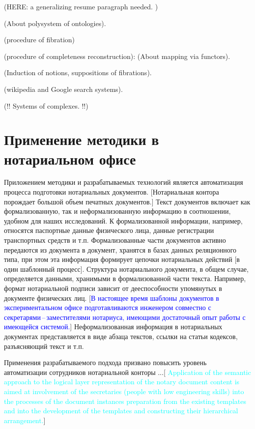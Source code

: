 \documentclass[utf8]{../IncArticle}
\newcommand{\e}[2][fcolor]{\textcolor{pcolor}{[}\textcolor{#1}{#2}\textcolor{pcolor}{]}}
\begin{document}
(HERE: a generalizing resume paragraph needed.  )

(About polysystem of ontologies).

(procedure of fibration)

(procedure of completeness reconstruction): (About mapping via functors).

(Induction of notions, suppositions of fibrations).

(wikipedia and Google search systems).

(!! Systems of complexes. !!)

\section{Применение методики в нотариальном офисе}

Приложением методики и разрабатываемых технологий является
автоматизация процесса подготовки нотариальных документов.
\e{Нотариальная контора порождает большой объем печатных документов.}
Текст документов включает как формализованную, так и неформализованную
информацию в соотношении, удобном для наших исследований.  К
формализованной информации, например, относятся паспортные данные
физического лица, данные регистрации транспортных средств и т.п.
Формализованные части документов активно передаются из документа в
документ, хранятся в базах данных реляционного типа, при этом эта
информация формирует цепочки нотариальных действий \e{в один шаблонный
процесс}.  Структура нотариального документа, в общем случае,
определяется данными, хранимыми в формализованной части текста.
Например, формат нотариальной подписи зависит от дееспособности
упомянутых в документе физических лиц.  \e[blue]{В настоящее время шаблоны
документов в экспериментальном офисе подготавливаются инженером
совместно с секретарями\,--\,заместителями нотариуса, имеющими
достаточный опыт работы с имеющейся системой.} Неформализованная
информация в нотариальных документах представляется в виде абзаца
текстов, ссылки на статьи кодексов, разъясняющий текст и т.п.

Применения разрабатываемого подхода призвано повысить уровень
автоматизации сотрудников нотариальной конторы ...\e[cyan]{ Application of the semantic approach to the logical layer representation of the notary document content is aimed at involvement of the secretaries (people with low engineering skills) into the processes of the document instances preparation from the existing templates and into the development of the templates and constructing their hierarchical arrangement.}
\end{document}
